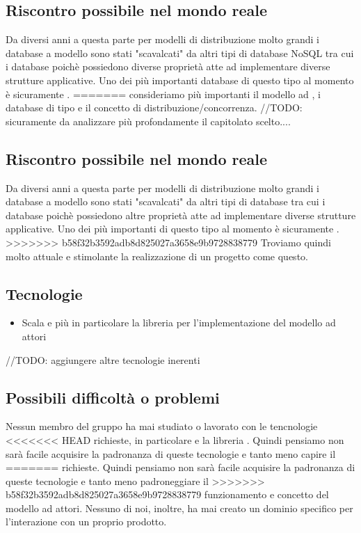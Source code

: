 \documentclass{scalatekids-article}
\begin{document}
\subsection{Riscontro possibile nel mondo reale}
Da diversi anni a questa parte per modelli di distribuzione molto grandi i
database a modello  sono stati "scavalcati" da altri tipi di
database NoSQL tra cui i database  poichè possiedono diverse
proprietà atte ad implementare diverse strutture applicative. Uno dei più
importanti database di questo tipo al momento è sicuramente .
=======
consideriamo più importanti il modello ad , i database di tipo
 e il concetto di distribuzione/concorrenza.
//TODO: sicuramente da analizzare più profondamente il capitolato scelto....

\subsection{Riscontro possibile nel mondo reale}
Da diversi anni a questa parte per modelli di distribuzione molto grandi i
database a modello  sono stati "scavalcati" da altri tipi di
database  tra cui i database  poichè possiedono altre
proprietà atte ad implementare diverse strutture applicative. Uno dei più
importanti  di questo tipo al momento è sicuramente .
>>>>>>> b58f32b3592adb8d825027a3658e9b9728838779
Troviamo quindi molto attuale e stimolante la realizzazione di un progetto come
questo.

\subsection{Tecnologie}
\begin{itemize}
\item Scala e più in particolare la libreria  per l'implementazione del modello ad attori
\end{itemize}
//TODO: aggiungere altre tecnologie inerenti

\subsection{Possibili difficoltà o problemi}
Nessun membro del gruppo ha mai studiato o lavorato con le tencnologie
<<<<<<< HEAD
richieste, in particolare  e la libreria . Quindi pensiamo non sarà
facile acquisire la padronanza di queste tecnologie e tanto meno capire il
=======
richieste. Quindi pensiamo non sarà facile acquisire la padronanza di queste tecnologie e tanto meno padroneggiare il
>>>>>>> b58f32b3592adb8d825027a3658e9b9728838779
funzionamento e concetto del modello ad attori. Nessuno di noi, inoltre, ha mai
creato un dominio specifico per l'interazione con un proprio prodotto.
\end{document}
